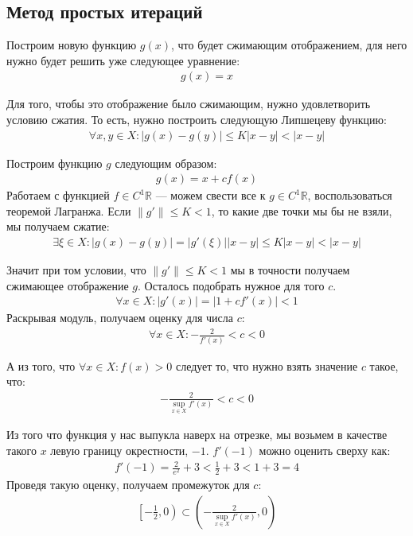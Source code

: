 \subsection{Метод простых итераций}

Построим новую функцию \(g(x)\), что будет сжимающим отображением, для него нужно будет решить уже следующее уравнение:
\begin{align}
  g(x) = x 
\end{align}

Для того, чтобы это отображение было сжимающим, нужно удовлетворить условию сжатия. То есть, нужно построить следующую Липшецеву функцию:
\begin{align}
  \forall x, y \in X \colon |g(x) - g(y)| \leq K |x - y| < |x - y|
\end{align}

Построим функцию \(g\) следующим образом:
\begin{align}\label{eq:g_def}
  g(x) = x + c f(x)
\end{align}
Работаем с функцией \(f \in C^1 \mathbb{R} \) --- можем свести все к \(g \in C^1 \mathbb{R} \), воспользоваться теоремой Лагранжа. Если \(\|g'\| \leq K < 1\), то какие две точки мы бы не взяли, мы получаем сжатие:
\begin{align}
  \exists \xi \in X \colon |g(x) - g(y)| = |g'(\xi)| |x - y| \leq K |x - y| < |x - y|
\end{align}

Значит при том условии, что \(\|g'\| \leq K < 1\) мы в точности получаем сжимающее отображение \(g\). Осталось подобрать нужное для того \( c \).
\begin{align}
  \forall x \in X \colon |g'(x)| = |1 + c f'(x)| < 1
\end{align}
Раскрывая модуль, получаем оценку для числа \(c\):
\begin{align}
  \forall x \in X \colon -\frac{2}{f'(x)} < c < 0
\end{align}

А из того, что \(\forall x \in X \colon f(x) > 0\) следует то, что нужно взять значение \(c\) такое, что:
\begin{align}
  -\frac{2}{\sup\limits_{x\in X} f'(x)} < c < 0
\end{align}

Из того что функция у нас выпукла наверх на отрезке, мы возьмем в качестве такого \(x\) левую границу окрестности, \(-1\). \(f'(-1)\) можно оценить сверху как:
\begin{align}
  f'(-1) = \frac{2}{e^2} + 3 < \frac{1}{2} + 3 < 1 + 3 = 4
\end{align}
Проведя такую оценку, получаем промежуток для \(c\):
\begin{align}
  \left[-\frac{1}{2}, 0\right) \subset \left(-\frac{2}{\sup\limits_{x\in X} f'(x)} , 0\right)
\end{align}

